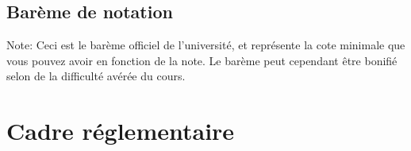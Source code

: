 \documentclass[12pt,undergraduate]{uqtrplandecours}
\begin{document}
\subsection*{Barème de notation}

\printgrades

Note: Ceci est le barème officiel de l'université,
  et représente la cote minimale que vous pouvez avoir en fonction de la note.
Le barème peut cependant être bonifié selon de la difficulté avérée du cours.


\section{Cadre réglementaire}
\cadrereglementaire


\clearpage
\signatures



\end{document}
